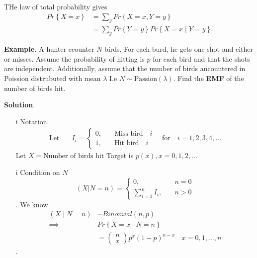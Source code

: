 \documentclass{article}
\theoremstyle{remark}
\begin{document}
  THe law of total probability gives \[
  \begin{split}
    Pr \left \{ X = x \right \}  &=  \sum_{y}^{}  Pr \left \{ X =x, Y =y \right \} \\
    &=  \sum_{y}^{}  Pr \left \{ Y=y  \right \} Pr \left \{ X =x  \mid  Y =y \right \}   
  \end{split} 
  \] 
   \begin{tcolorbox}
     \textbf{Example.} A hunter ecounter $N$ birds. For each burd, he gets one shot and either or misses. Assume the probability of hitting is $p$ for each bird and that the shots are independent. Additionally, assume that the number of birds ancountered in Poission distrubuted with mean $\lambda$ I.e $N \sim \text{Passion}\left( \lambda  \right)$. Find the \textbf{EMF}  of the number of birds hit.
     \par \textbf{Solution}. 
     \begin{itemize}
       \item[i] Notation. \[
       \begin{split}
         \text{Let} \quad    &  I_{i} = \begin{cases}
           0,  &  \quad  \text{Miss bird}\quad   i \\
          1 ,   & \quad     \text{Hit bird} \quad   i 
         \end{cases} \quad \text{for} \quad i = 1,2,3,4, \ldots  
       \end{split} 
       \] 
       Let $X = \text{Number of birds hit}$
       Target is $p\left( x \right), x = 0,1,2, \ldots$
       \item[i] Condition on $N$ \[
       \left( X | N=n \right) = \begin{cases}
         0,  &  \quad  n =0 \\
         \sum_{i=1}^{n}  I_{i} ,  &  \quad  n >0  
       \end{cases}
       \] .  
       We know \[
         \begin{split}
       \left( X  \mid  N =n \right)   & \sim Binomial\left( n, p \right)  \\
       \implies  &  Pr \left \{ X =x  \mid  N =n \right \}  \\
       &= \begin{pmatrix}
       n \\
       x
       \end{pmatrix} 
       p ^{x} \left( 1-p \right)^{n-x} \quad  x = 0,1, \ldots, n   
         \end{split} 
       \]   . 

\end{itemize}
\end{tcolorbox}
\end{document}

